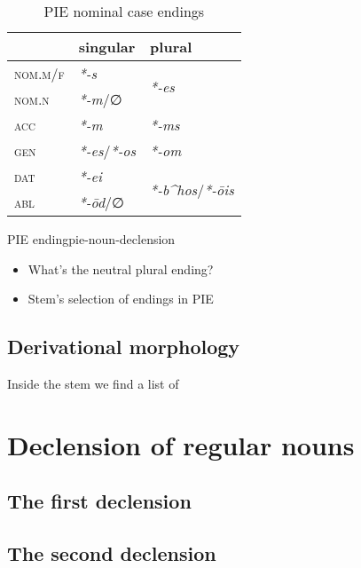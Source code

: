 \documentclass[a4paper, oneside, 12pt]{report}
\newcommand{\form}[1]{\emph{#1}}
\newcommand*{\category}[1]{\textsc{#1}}
\begin{document}
\begin{table}[H]
    \caption{PIE nominal case endings}
    \centering
    \begin{tabular}{lll}
        \toprule
                           & singular     & plural      \\
        \midrule                       
        \category{nom.m/f} & \form{*-s}   & \multirow{2}{*}{\form{*-es}} \\
        \category{nom.n}   & \form{*-m}/∅ &  \\
        \category{acc}     & \form{*-m}   & \form{*-ms} \\
        \category{gen}     & \form{*-es}/\form{*-os} & \form{*-om} \\
        \category{dat}     & \form{*-ei}  & \multirow{2}{*}{\form{*-b^hos}/\form{*-\={o}is}} \\
        \category{abl}     & \form{*-\={o}d}/∅ & \\
        \bottomrule
    \end{tabular}
\end{table}

\begin{todobox}{PIE ending}{pie-noun-declension}
    \begin{itemize}
        \item What's the neutral plural ending?
        \item Stem's selection of endings in PIE
    \end{itemize}
\end{todobox}

\subsection{Derivational morphology}

Inside the stem we find a list of 

\section{Declension of regular nouns}\label{sec:regular-noun-declension}

\subsection{The first declension}



\subsection{The second declension}
\end{document}
